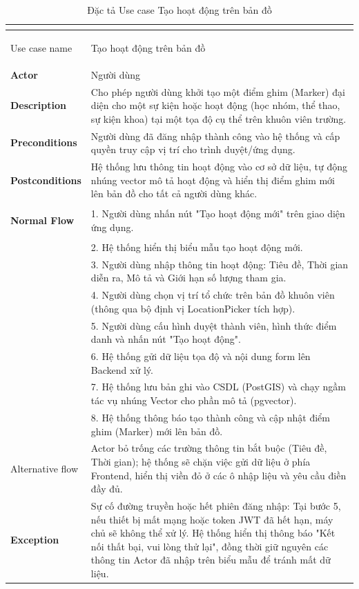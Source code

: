 \renewcommand{\arraystretch}{1.5} %
\begin{xltabular}{\textwidth}{|>{\bfseries}p{3.5cm}|X|}
    \caption{Đặc tả Use case Tạo hoạt động trên bản đồ} \label{tab:uc_taohoatdong} \\
    \hline
    \endfirsthead
    \caption[]{Đặc tả Use case Tạo hoạt động trên bản đồ} \\
    \hline
    \endhead
    \hline
    \endfoot
    \hline
    \endlastfoot

    Use case name & Tạo hoạt động trên bản đồ \\ \hline
    Actor & Người dùng \\ \hline
    Description & Cho phép người dùng khởi tạo một điểm ghim (Marker) đại diện cho một sự kiện hoặc hoạt động (học nhóm, thể thao, sự kiện khoa) tại một tọa độ cụ thể trên khuôn viên trường. \\ \hline
    Preconditions & Người dùng đã đăng nhập thành công vào hệ thống và cấp quyền truy cập vị trí cho trình duyệt/ứng dụng. \\ \hline
    Postconditions & Hệ thống lưu thông tin hoạt động vào cơ sở dữ liệu, tự động nhúng vector mô tả hoạt động và hiển thị điểm ghim mới lên bản đồ cho tất cả người dùng khác. \\ \hline
    
    \textbf{Normal Flow} & 1. Người dùng nhấn nút "Tạo hoạt động mới" trên giao diện ứng dụng. \\
    & 2. Hệ thống hiển thị biểu mẫu tạo hoạt động mới. \\ 
    & 3. Người dùng nhập thông tin hoạt động: Tiêu đề, Thời gian diễn ra, Mô tả và Giới hạn số lượng tham gia. \\ 
    & 4. Người dùng chọn vị trí tổ chức trên bản đồ khuôn viên (thông qua bộ định vị LocationPicker tích hợp). \\ 
    & 5. Người dùng cấu hình duyệt thành viên, hình thức điểm danh và nhấn nút "Tạo hoạt động". \\ 
    & 6. Hệ thống gửi dữ liệu tọa độ và nội dung form lên Backend xử lý. \\ 
    & 7. Hệ thống lưu bản ghi vào CSDL (PostGIS) và chạy ngầm tác vụ nhúng Vector cho phần mô tả (pgvector). \\ 
    & 8. Hệ thống thông báo tạo thành công và cập nhật điểm ghim (Marker) mới lên bản đồ. \\ \hline
    
    Alternative flow & Actor bỏ trống các trường thông tin bắt buộc (Tiêu đề, Thời gian); hệ thống sẽ chặn việc gửi dữ liệu ở phía Frontend, hiển thị viền đỏ ở các ô nhập liệu và yêu cầu điền đầy đủ. \\ \hline
    Exception & Sự cố đường truyền hoặc hết phiên đăng nhập: Tại bước 5, nếu thiết bị mất mạng hoặc token JWT đã hết hạn, máy chủ sẽ không thể xử lý. Hệ thống hiển thị thông báo "Kết nối thất bại, vui lòng thử lại", đồng thời giữ nguyên các thông tin Actor đã nhập trên biểu mẫu để tránh mất dữ liệu. \\ \hline

\end{xltabular}

